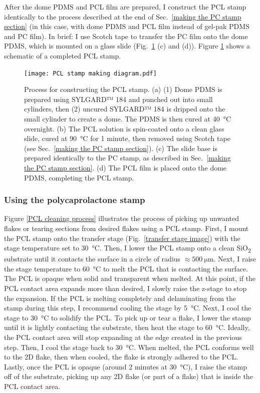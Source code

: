 \documentclass{beavtex_dub_edit}
\begin{document}
After the dome PDMS and PCL film are prepared, I construct the PCL stamp identically to the process described at the end of Sec.\ \ref{making the PC stamp section} (in this case, with dome PDMS and PCL film instead of gel-pak PDMS and PC film). In brief: I use Scotch tape to transfer the PC film onto the dome PDMS, which is mounted on a glass slide (Fig.\ \ref{PCL stamp making diagram} (c) and (d)). Figure \ref{PCL stamp making diagram} shows a schematic of a completed PCL stamp.

\begin{figure}
    \texttt{[image: PCL stamp making diagram.pdf]}
    \caption[Process for constructing the PCL stamp.]{Process for constructing the PCL stamp. (a) (1) Dome PDMS is prepared using SYLGARD™ 184 and punched out into small cylinders, then (2) uncured SYLGARD™ 184 is dripped onto the small cylinder to create a dome. The PDMS is then cured at \SI{40}{\celsius} overnight. (b) The PCL solution is spin-coated onto a clean glass slide, cured at \SI{90}{\celsius} for 1 minute, then removed using Scotch tape (see Sec.\ \ref{making the PC stamp section}). (c) The slide base is prepared identically to the PC stamp, as described in Sec.\ \ref{making the PC stamp section}. (d) The PCL film is placed onto the dome PDMS, completing the PCL stamp.}
    \label{PCL stamp making diagram}
\end{figure}

\subsubsection{Using the polycaprolactone stamp}
Figure \ref{PCL cleaning process} illustrates the process of picking up unwanted flakes or tearing sections from desired flakes using a PCL stamp. First, I mount the PCL stamp onto the transfer stage (Fig.\ \ref{transfer stage image}) with the stage temperature set to \SI{30}{\celsius}. Then, I lower the PCL stamp onto a clean SiO\textsubscript{2} substrate until it contacts the surface in a circle of radius $\approx \SI{500}{\micro\meter}$. Next, I raise the stage temperature to \SI{60}{\celsius} to melt the PCL that is contacting the surface. The PCL is opaque when solid and transparent when melted. At this point, if the PCL contact area expands more than desired, I slowly raise the z-stage to stop the expansion. If the PCL is melting completely and delaminating from the stamp during this step, I recommend cooling the stage by \SI{5}{\celsius}. Next, I cool the stage to \SI{30}{\celsius} to solidify the PCL. To pick up or tear a flake, I lower the stamp until it is lightly contacting the substrate, then heat the stage to \SI{60}{\celsius}. Ideally, the PCL contact area will stop expanding at the edge created in the previous step. Then, I cool the stage back to \SI{30}{\celsius}. When melted, the PCL conforms well to the 2D flake, then when cooled, the flake is strongly adhered to the PCL. Lastly, once the PCL is opaque (around 2 minutes at \SI{30}{\celsius}), I raise the stamp off of the substrate, picking up any 2D flake (or part of a flake) that is inside the PCL contact area.
\end{document}
